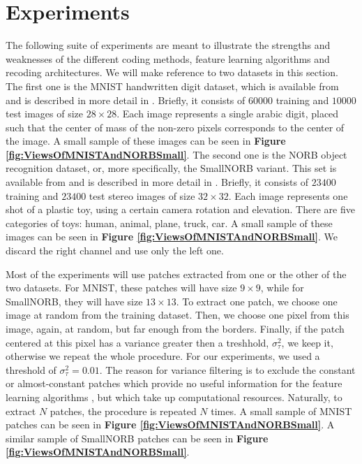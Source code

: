\documentclass[12pt,a4paper,oneside,english]{UPBThesis}
\newcommand{\hctimes}[2]{{#1}\!\times\!{#2}}
\begin{document}
\chapter{Experiments}
\label{chap:Experiments}

The following suite of experiments are meant to illustrate the strengths and weaknesses of the different coding methods, feature learning algorithms and recoding architectures. We will make reference to two datasets in this section. The first one is the MNIST handwritten digit dataset, which is available from \cite{mnist-website} and is described in more detail in \cite{gradient-based-learning}. Briefly, it consists of $60000$ training and $10000$ test images of size $\hctimes{28}{28}$. Each image represents a single arabic digit, placed such that the center of mass of the non-zero pixels corresponds to the center of the image. A small sample of these images can be seen in \textbf{Figure \ref{fig:ViewsOfMNISTAndNORBSmall}}. The second one is the NORB object recognition dataset, or, more specifically, the SmallNORB variant. This set is available from \cite{norbsmall-website} and is described in more detail in \cite{learning-methods-invariance-pose-lighting}. Briefly, it consists of $23400$ training and $23400$ test stereo images of size $\hctimes{32}{32}$. Each image represents one shot of a plastic toy, using a certain camera rotation and elevation. There are five categories of toys: human, animal, plane, truck, car. A small sample of these images can be seen in \textbf{Figure \ref{fig:ViewsOfMNISTAndNORBSmall}}. We discard the right channel and use only the left one.

Most of the experiments will use patches extracted from one or the other of the two datasets. For MNIST, these patches will have size $\hctimes{9}{9}$, while for SmallNORB, they will have size $\hctimes{13}{13}$. To extract one patch, we choose one image at random from the training dataset. Then, we choose one pixel from this image, again, at random, but far enough from the borders. Finally, if the patch centered at this pixel has a variance greater then a treshhold, $\sigma^2_\tau$, we keep it, otherwise we repeat the whole procedure. For our experiments, we used a threshold of $\sigma^2_\tau = 0.01$. The reason for variance filtering is to exclude the constant or almost-constant patches which provide no useful information for the feature learning algorithms \cite{simple-method-sparse-coding,tiny-images}, but which take up computational resources. Naturally, to extract $N$ patches, the procedure is repeated $N$ times. A small sample of MNIST patches can be seen in \textbf{Figure \ref{fig:ViewsOfMNISTAndNORBSmall}}. A similar sample of SmallNORB patches can be seen in \textbf{Figure \ref{fig:ViewsOfMNISTAndNORBSmall}}.
\end{document}
